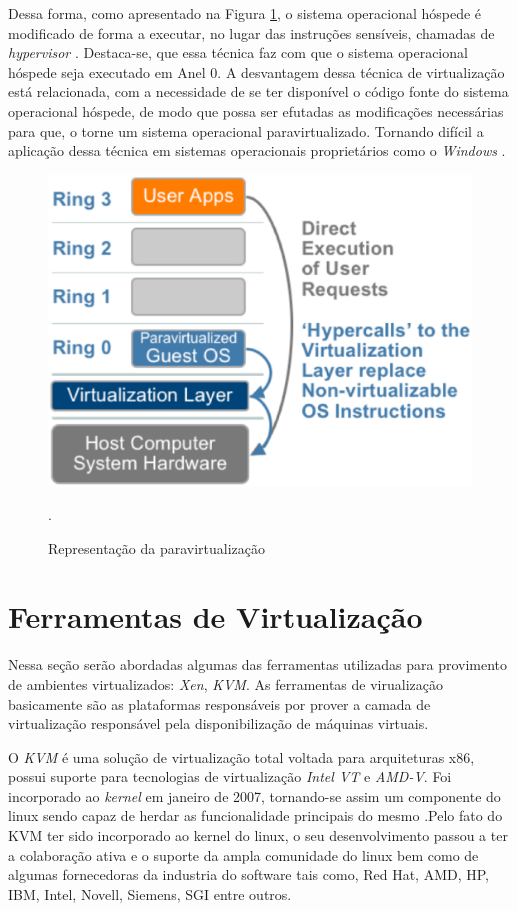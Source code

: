 Dessa forma, como apresentado na Figura \ref{paravirtualization}, o sistema operacional hóspede é modificado de forma a executar, no lugar das instruções sensíveis, chamadas de \textit{hypervisor} \cite{tanembaum}. Destaca-se, que essa técnica faz com que o sistema operacional hóspede seja executado em Anel 0. A desvantagem dessa técnica de virtualização está relacionada, com a necessidade de se ter disponível o código fonte do sistema operacional hóspede, de modo que possa ser efutadas as modificações necessárias para que, o torne um sistema operacional paravirtualizado. Tornando difícil a aplicação dessa técnica em sistemas operacionais proprietários como o \textit{Windows} \cite{tanembaum}.
\begin{figure}[!htb]
\centering
\includegraphics [keepaspectratio=true,scale=0.3]{figuras/paravirtualization2.eps}
\caption{Representação da paravirtualização}
\cite{vmware}.
\label{paravirtualization}
\end{figure}

\section{Ferramentas de Virtualização}
Nessa seção serão abordadas algumas das ferramentas utilizadas para provimento de ambientes virtualizados: \textit{Xen}, \textit{KVM}. As ferramentas de virualização basicamente são as plataformas responsáveis por prover a camada de virtualização responsável pela disponibilização de máquinas virtuais.

O \textit{KVM} é uma solução de virtualização total voltada para arquiteturas x86, possui suporte para tecnologias de virtualização \textit{Intel VT} e \textit{AMD-V}. Foi incorporado ao \textit{kernel} em janeiro de 2007, tornando-se assim um componente do linux sendo capaz de herdar as funcionalidade principais do mesmo \cite{redhatkvm,qumranet}.Pelo fato do KVM ter sido incorporado ao kernel do linux, o seu desenvolvimento passou a ter a colaboração ativa e o suporte da ampla comunidade do linux bem como de algumas fornecedoras da industria do software tais como, Red Hat, AMD, HP, IBM, Intel, Novell, Siemens, SGI entre outros\cite {redhatkvm}.


